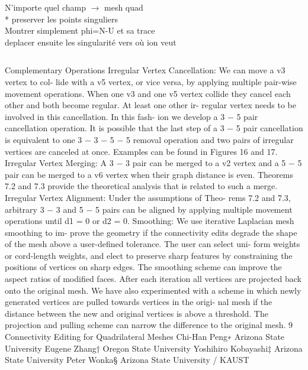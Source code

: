N'importe quel champ $\longrightarrow$  mesh quad\\*
preserver les points singuliers\\
Montrer simplement phi=N-U et sa trace\\
deplacer ensuite les singularité vers où ion veut

\[\]

Complementary Operations
Irregular Vertex Cancellation: We can move a v3 vertex to col-
lide with a v5 vertex, or vice versa, by applying multiple pair-wise
movement operations. When one v3 and one v5 vertex collide they
cancel each other and both become regular. At least one other ir-
regular vertex needs to be involved in this cancellation. In this fash-
ion we develop a 3 − 5 pair cancellation operation. It is possible
that the last step of a 3 − 5 pair cancellation is equivalent to one
3 − 3 − 5 − 5 removal operation and two pairs of irregular vertices
are canceled at once. Examples can be found in Figures 16 and 17.
Irregular Vertex Merging: A 3 − 3 pair can be merged to a v2
vertex and a 5 − 5 pair can be merged to a v6 vertex when their
graph distance is even. Theorems 7.2 and 7.3 provide the theoretical
analysis that is related to such a merge.
Irregular Vertex Alignment: Under the assumptions of Theo-
rems 7.2 and 7.3, arbitrary 3 − 3 and 5 − 5 pairs can be aligned
by applying multiple movement operations until d1 = 0 or d2 = 0.
Smoothing: We use iterative Laplacian mesh smoothing to im-
prove the geometry if the connectivity edits degrade the shape of
the mesh above a user-defined tolerance. The user can select uni-
form weights or cord-length weights, and elect to preserve sharp
features by constraining the positions of vertices on sharp edges.
The smoothing scheme can improve the aspect ratios of modified
faces. After each iteration all vertices are projected back onto the
original mesh. We have also experimented with a scheme in which
newly generated vertices are pulled towards vertices in the origi-
nal mesh if the distance between the new and original vertices is
above a threshold. The projection and pulling scheme can narrow
the difference to the original mesh. 
9 Connectivity Editing for Quadrilateral Meshes
Chi-Han Peng∗
Arizona State University
Eugene Zhang†
Oregon State University
Yoshihiro Kobayashi‡
Arizona State University
Peter Wonka§
Arizona State University /
KAUST
